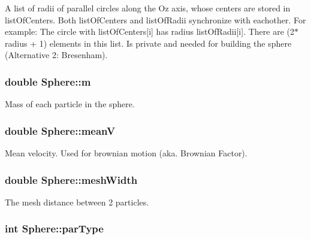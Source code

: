 A list of radii of parallel circles along the Oz axis, whose centers are stored in list\-Of\-Centers. Both list\-Of\-Centers and list\-Of\-Radii synchronize with eachother. For example\-: The circle with list\-Of\-Centers\mbox{[}i\mbox{]} has radius list\-Of\-Radii\mbox{[}i\mbox{]}. There are (2$\ast$radius + 1) elements in this list. Is private and needed for building the sphere (Alternative 2\-: Bresenham). \hypertarget{classSphere_aa98b073187155748b82f6675aa65a2d3}{
\subsubsection[{m}]{\setlength{\rightskip}{0pt plus 5cm}double Sphere\-::m\hspace{0.3cm}{\ttfamily [private]}}}\label{classSphere_aa98b073187155748b82f6675aa65a2d3}
Mass of each particle in the sphere. \hypertarget{classSphere_a2cd2b54a44a8c48132a37bc99e9540a3}{
\subsubsection[{mean\-V}]{\setlength{\rightskip}{0pt plus 5cm}double Sphere\-::mean\-V\hspace{0.3cm}{\ttfamily [private]}}}\label{classSphere_a2cd2b54a44a8c48132a37bc99e9540a3}
Mean velocity. Used for brownian motion (aka. Brownian Factor). \hypertarget{classSphere_a0e2523061bbf7ebef88534efeefe91f9}{
\subsubsection[{mesh\-Width}]{\setlength{\rightskip}{0pt plus 5cm}double Sphere\-::mesh\-Width\hspace{0.3cm}{\ttfamily [private]}}}\label{classSphere_a0e2523061bbf7ebef88534efeefe91f9}
The mesh distance between 2 particles. \hypertarget{classSphere_ae52652f5262aa5268f2442a0c598917e}{
\subsubsection[{par\-Type}]{\setlength{\rightskip}{0pt plus 5cm}int Sphere\-::par\-Type\hspace{0.3cm}{\ttfamily [private]}}}\label{classSphere_ae52652f5262aa5268f2442a0c598917e}
